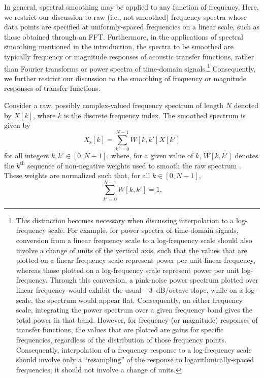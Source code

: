In general, spectral smoothing may be applied to any function of frequency.
Here, we restrict our discussion to raw (i.e., not smoothed) frequency spectra whose data points are specified at uniformly-spaced frequencies on a linear scale, such as those obtained through an FFT.
Furthermore, in the applications of spectral smoothing mentioned in the introduction, the spectra to be smoothed are typically frequency or magnitude responses of acoustic transfer functions, rather than Fourier transforms or power spectra of time-domain signals.\footnote{This distinction becomes necessary when discussing interpolation to a log-frequency scale.
For example, for power spectra of time-domain signals, conversion from a linear frequency scale to a log-frequency scale should also involve a change of units of the vertical axis, such that the values that are plotted on a linear frequency scale represent power per unit linear frequency, whereas those plotted on a log-frequency scale represent power per unit log-frequency.
Through this conversion, a pink-noise power spectrum plotted over linear frequency would exhibit the usual $-3$~dB/octave slope, while on a log-scale, the spectrum would appear flat.
Consequently, on either frequency scale, integrating the power spectrum over a given frequency band gives the total power in that band.
However, for frequency (or magnitude) responses of transfer functions, the values that are plotted are gains for specific frequencies, regardless of the distribution of those frequency points.
Consequently, interpolation of a frequency response to a log-frequency scale should involve only a ``resampling'' of the response to logarithmically-spaced frequencies; it should not involve a change of units.} Consequently, we further restrict our discussion to the smoothing of frequency or magnitude responses of transfer functions.

Consider a raw, possibly complex-valued frequency spectrum of length $N$ denoted by $X[k]$, where $k$ is the discrete frequency index.
The smoothed spectrum is given by
\begin{equation}\label{eq:A3_Smoothing_Weights:SmoothingSummation}
X_\textrm{s}[k] = \sum_{k' = 0}^{N - 1} W[k, k'] X[k']
\end{equation}
for all integers $k,k' \in [0, N - 1]$, where, for a given value of $k$, $W[k, k']$ denotes the $k^{\textrm{th}}$ sequence of non-negative weights used to smooth the raw spectrum \citep{HatziantoniouMourjopoulos2000}.
These weights are normalized such that, for all $k \in [0, N - 1]$,
\begin{equation}\label{eq:A3_Smoothing_Weights:WeightNorm}
\sum_{k' = 0}^{N - 1} W[k, k'] = 1.
\end{equation}

